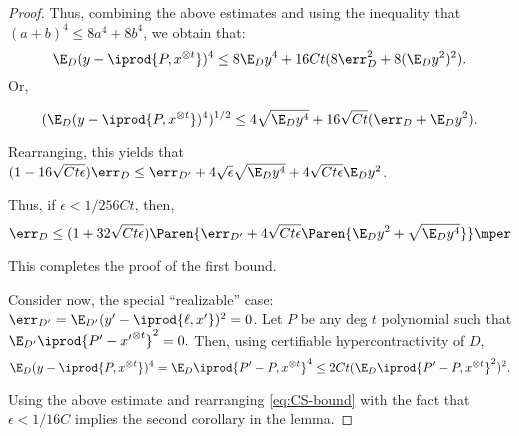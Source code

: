 {\begin{proof}
Thus, combining the above estimates and using the inequality that $(a+b)^4 \leq 8a^4 + 8b^4$, we obtain that:
\[
\E_D (y-\iprod{P,x^{\otimes t}})^4 \leq 8 \E_D y^4 + 16Ct (8 \err_{D}^2 + 8(\E_D y^2)^2 ).
\] 
Or,

\[
(\E_D (y-\iprod{P,x^{\otimes t}})^4)^{1/2} \leq 4\sqrt{\E_D y^4} + 16\sqrt{Ct} (\err_{D} + \E_D y^2).
\] 

Rearranging, this yields that $(1- 16\sqrt{Ct\epsilon}) \err_D \leq \err_{D'} + 4 \sqrt{\epsilon} \sqrt{\E_D y^4}+ 4\sqrt{Ct \epsilon} \E_D y^2$. 

Thus, if $\epsilon < 1/256Ct$, then, 
\[
\err_D \leq (1+ 32 \sqrt{Ct\epsilon}) \Paren{\err_{D'} + 4 \sqrt{Ct \epsilon} \Paren{\E_D y^2 + \sqrt{\E_D y^4}}}\mper
\]




This completes the proof of the first bound. 

Consider now, the special ``realizable'' case: $\err_{D'} = \E_{D'} (y' - \iprod{\ell,x'})^2 = 0$. Let $P$ be any deg $t$ polynomial such that $\E_{D'} \iprod{P'-{x'}^{\otimes t}}^2 = 0.$ Then, using certifiable hypercontractivity of $D$, 
\[
\E_{D} (y-\iprod{P,x^{\otimes t}})^4 = \E_{D} \iprod{P'-P,x^{\otimes t}}^4 \leq 2Ct(\E_{D} \iprod{P'-P,x^{\otimes t}}^2)^2.
\] 

Using the above estimate and rearranging \eqref{eq:CS-bound} with the fact that $\epsilon < 1/16C$ implies the second corollary in the lemma. 
\end{proof}
}%



% 



